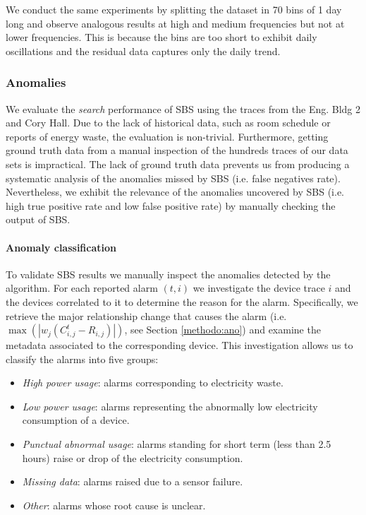 We conduct the same experiments by splitting the dataset in 70 bins of 1 day long and observe analogous results at high and medium frequencies but not at lower frequencies.  This is because the bins are too short to exhibit daily oscillations and the residual data captures only the daily trend.


\subsubsection{Anomalies}
We evaluate the \emph{search} performance of SBS using the traces from the Eng. Bldg 2 and Cory Hall.
Due to the lack of historical data, such as room schedule or reports of energy waste, the evaluation is non-trivial.
Furthermore, getting ground truth data from a manual inspection of the hundreds traces of our data sets is impractical.
The lack of ground truth data prevents us from producing a systematic analysis of the anomalies missed by SBS (i.e. false negatives rate).
Nevertheless, we exhibit the relevance of the anomalies uncovered by SBS (i.e. high true positive rate and low false positive rate) by manually checking the output of SBS.

\paragraph{Anomaly classification}
To validate SBS results we manually inspect the anomalies detected by the algorithm.  
For each reported alarm $(t,i)$ we investigate the device trace $i$ and the devices correlated to it
to determine the reason for the alarm.
Specifically, we retrieve the major relationship change that causes the alarm (i.e. $\max(|w_j(C_{i,j}^t - R_{i,j})|)$, 
see Section \ref{methodo:ano}) and examine the metadata associated to the corresponding device.
This investigation allows us to classify the alarms into five groups:
\begin{itemize}
 \item \emph{High power usage}: alarms corresponding to electricity waste.
 \item \emph{Low power usage}: alarms representing the abnormally low electricity consumption of a device.
 \item \emph{Punctual abnormal usage}: alarms standing for short term (less than 2.5 hours) raise or drop of the electricity consumption.
 \item \emph{Missing data}: alarms raised due to a sensor failure.
 \item \emph{Other}: alarms whose root cause is unclear.
\end{itemize}

